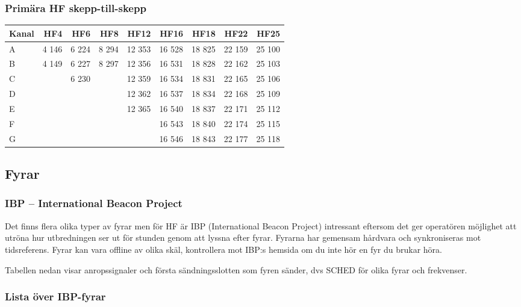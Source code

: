 \subsubsection{Primära HF skepp-till-skepp}

\begin{longtable}{lrrrrrrrr}
\textbf{Kanal} & \textbf{HF4} & \textbf{HF6} & \textbf{HF8} &
               \textbf{HF12} & \textbf{HF16} & \textbf{HF18} &
               \textbf{HF22} & \textbf{HF25} \\
\hline
\endhead

A & 4 146 & 6 224 & 8 294 & 12 353 & 16 528 & 18 825 & 22 159 & 25 100 \\
B & 4 149 & 6 227 & 8 297 & 12 356 & 16 531 & 18 828 & 22 162 & 25 103 \\
C &       & 6 230 &       & 12 359 & 16 534 & 18 831 & 22 165 & 25 106 \\
D &       &       &       & 12 362 & 16 537 & 18 834 & 22 168 & 25 109 \\
E &       &       &       & 12 365 & 16 540 & 18 837 & 22 171 & 25 112 \\
F &       &       &       &        & 16 543 & 18 840 & 22 174 & 25 115 \\
G &       &       &       &        & 16 546 & 18 843 & 22 177 & 25 118 \\
\end{longtable}

\clearpage

\subsection{Fyrar}

\subsubsection{IBP -- International Beacon Project}

Det finns flera olika typer av fyrar men för HF är IBP (International
Beacon Project) intressant eftersom det ger operatören möjlighet att
utröna hur utbredningen ser ut för stunden genom att lyssna efter
fyrar. Fyrarna har gemensam hårdvara och synkroniseras mot
tidsreferens. Fyrar kan vara offline av olika skäl, kontrollera mot
IBP:s hemsida om du inte hör en fyr du brukar höra.

Tabellen nedan visar anropssignaler och första sändningsslotten som
fyren sänder, dvs SCHED för olika fyrar och frekvenser.

\subsubsection{Lista över IBP-fyrar}

